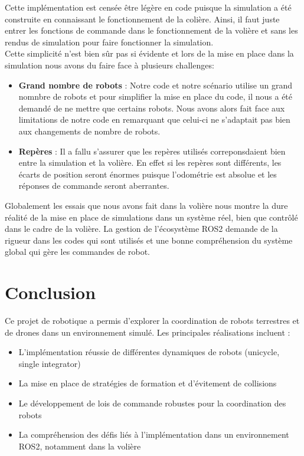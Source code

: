 \documentclass[a4paper,12pt]{article}
\begin{document}
Cette implémentation est censée être légère en code puisque la simulation a été construite en connaissant le fonctionnement de la colière. Ainsi, il faut juste entrer les fonctions de commande dans le fonctionnement de la volière et sans les rendus de simulation pour faire fonctionner la simulation.\\

Cette simplicité n'est bien sûr pas si évidente et lors de la mise en place dans la simulation nous avons du faire face à plusieurs challenges:

\begin{itemize}
    \item \textbf{Grand nombre de robots} : Notre code et notre scénario utilise un grand nomnbre de robots et pour simplifier la mise en place du code, il nous a été demandé de ne mettre que certains robots. Nous avons alors fait face aux limitations de notre code en remarquant que celui-ci ne s'adaptait pas bien aux changements de nombre de robots. 
    \item \textbf{Repères} : Il a fallu s'assurer que les repères utilisés correponsdaient bien entre la simulation et la volière. En effet si les repères sont différents, les écarts de position seront énormes puisque l'odométrie est absolue et les réponses de commande seront aberrantes.
\end{itemize}

Globalement les essais que nous avons fait dans la volière nous montre la dure réalité de la mise en place de simulations dans un système réel, bien que contrôlé dans le cadre de la volière. La gestion de l'écosystème ROS2 demande de la rigueur dans les codes qui sont utilisés et une bonne compréhension du système global qui gère les commandes de robot.


\section*{Conclusion}
Ce projet de robotique a permis d'explorer la coordination de robots terrestres et de drones dans un environnement simulé. Les principales réalisations incluent :

\begin{itemize}
    \item L'implémentation réussie de différentes dynamiques de robots (unicycle, single integrator)
    \item La mise en place de stratégies de formation et d'évitement de collisions
    \item Le développement de lois de commande robustes pour la coordination des robots
    \item La compréhension des défis liés à l'implémentation dans un environnement ROS2, notamment dans la volière
\end{itemize}
\end{document}
